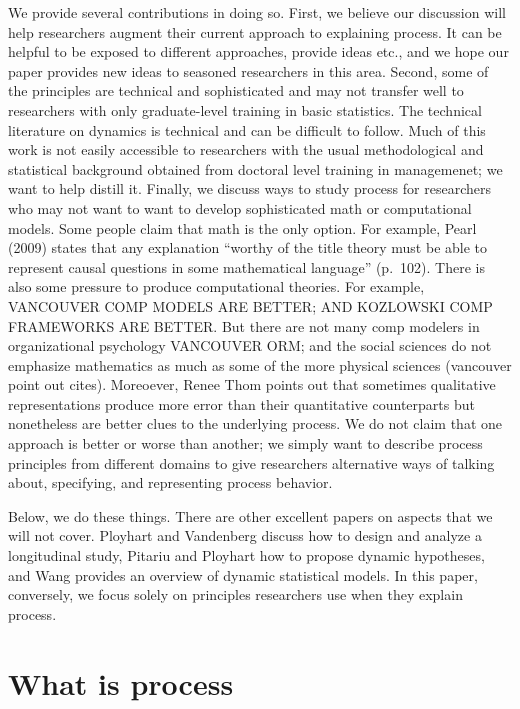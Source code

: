 \documentclass[english,,man]{apa6}
\theoremstyle{definition}
\theoremstyle{definition}
\theoremstyle{definition}
\theoremstyle{remark}
\begin{document}
We provide several contributions in doing so. First, we believe our
discussion will help researchers augment their current approach to
explaining process. It can be helpful to be exposed to different
approaches, provide ideas etc., and we hope our paper provides new ideas
to seasoned researchers in this area. Second, some of the principles are
technical and sophisticated and may not transfer well to researchers
with only graduate-level training in basic statistics. The technical
literature on dynamics is technical and can be difficult to follow. Much
of this work is not easily accessible to researchers with the usual
methodological and statistical background obtained from doctoral level
training in managemenet; we want to help distill it. Finally, we discuss
ways to study process for researchers who may not want to want to
develop sophisticated math or computational models. Some people claim
that math is the only option. For example, Pearl (2009) states that any
explanation \enquote{worthy of the title theory must be able to
represent causal questions in some mathematical language} (p.~102).
There is also some pressure to produce computational theories. For
example, VANCOUVER COMP MODELS ARE BETTER; AND KOZLOWSKI COMP FRAMEWORKS
ARE BETTER. But there are not many comp modelers in organizational
psychology VANCOUVER ORM; and the social sciences do not emphasize
mathematics as much as some of the more physical sciences (vancouver
point out cites). Moreoever, Renee Thom points out that sometimes
qualitative representations produce more error than their quantitative
counterparts but nonetheless are better clues to the underlying process.
We do not claim that one approach is better or worse than another; we
simply want to describe process principles from different domains to
give researchers alternative ways of talking about, specifying, and
representing process behavior.

Below, we do these things. There are other excellent papers on aspects
that we will not cover. Ployhart and Vandenberg discuss how to design
and analyze a longitudinal study, Pitariu and Ployhart how to propose
dynamic hypotheses, and Wang provides an overview of dynamic statistical
models. In this paper, conversely, we focus solely on principles
researchers use when they explain process.

\hypertarget{what-is-process}{%
\section{What is process}\label{what-is-process}}
\end{document}
